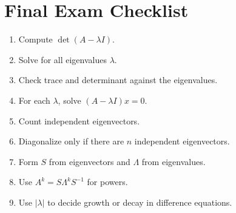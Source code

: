 \documentclass[10pt]{article}
\begin{document}
\section{Final Exam Checklist}

\begin{enumerate}
  \item Compute \(\det(A-\lambda I)\).
  \item Solve for all eigenvalues \(\lambda\).
  \item Check trace and determinant against the eigenvalues.
  \item For each \(\lambda\), solve \((A-\lambda I)x=0\).
  \item Count independent eigenvectors.
  \item Diagonalize only if there are \(n\) independent eigenvectors.
  \item Form \(S\) from eigenvectors and \(\Lambda\) from eigenvalues.
  \item Use \(A^{k}=S\Lambda^{k}S^{-1}\) for powers.
  \item Use \(|\lambda|\) to decide growth or decay in difference equations.
\end{enumerate}
\end{document}
